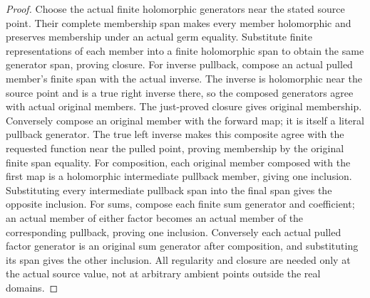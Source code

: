 \begin{proof}
Choose the actual finite holomorphic generators near the stated source point.
Their complete membership span makes every member holomorphic and preserves
membership under an actual germ equality. Substitute finite representations
of each member into a finite holomorphic span to obtain the same generator
span, proving closure. For inverse pullback, compose an actual pulled member's
finite span with the actual inverse. The inverse is holomorphic near the
source point and is a true right inverse there, so the composed generators
agree with actual original members. The just-proved closure gives original
membership. Conversely compose an original member with the forward map; it
is itself a literal pullback generator. The true left inverse makes this
composite agree with the requested function near the pulled point, proving
membership by the original finite span equality. For composition, each
original member composed with the first map is a holomorphic intermediate
pullback member, giving one inclusion. Substituting every intermediate
pullback span into the final span gives the opposite inclusion. For sums,
compose each finite sum generator and coefficient; an actual member of either
factor becomes an actual member of the corresponding pullback, proving one
inclusion. Conversely each actual pulled factor generator is an original sum
generator after composition, and substituting its span gives the other
inclusion. All regularity and closure are needed only at the actual source
value, not at arbitrary ambient points outside the real domains.
\end{proof}


